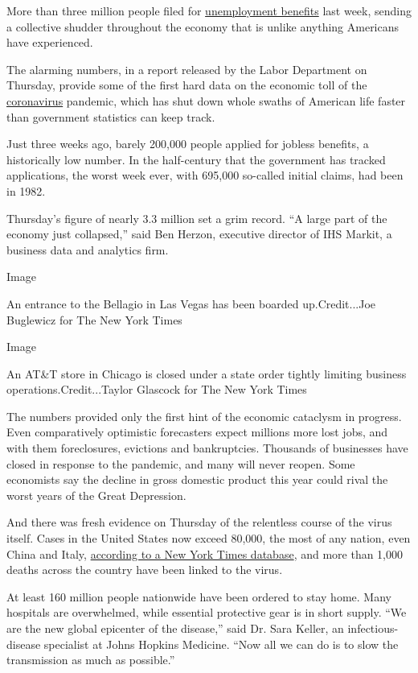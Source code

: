 More than three million people filed for
\href{https://www.nytimes.com/2020/04/03/upshot/coronavirus-jobless-rate-great-depression.html}{unemployment
benefits} last week, sending a collective shudder throughout the economy
that is unlike anything Americans have experienced.

The alarming numbers, in a report released by the Labor Department on
Thursday, provide some of the first hard data on the economic toll of
the
\href{https://www.nytimes.com/2020/04/03/upshot/coronavirus-jobless-rate-great-depression.html}{coronavirus}
pandemic, which has shut down whole swaths of American life faster than
government statistics can keep track.

Just three weeks ago, barely 200,000 people applied for jobless
benefits, a historically low number. In the half-century that the
government has tracked applications, the worst week ever, with 695,000
so-called initial claims, had been in 1982.

Thursday's figure of nearly 3.3 million set a grim record. ``A large
part of the economy just collapsed,'' said Ben Herzon, executive
director of IHS Markit, a business data and analytics firm.

Image

An entrance to the Bellagio in Las Vegas has been boarded
up.Credit...Joe Buglewicz for The New York Times

Image

An AT\&T store in Chicago is closed under a state order tightly limiting
business operations.Credit...Taylor Glascock for The New York Times

The numbers provided only the first hint of the economic cataclysm in
progress. Even comparatively optimistic forecasters expect millions more
lost jobs, and with them foreclosures, evictions and bankruptcies.
Thousands of businesses have closed in response to the pandemic, and
many will never reopen. Some economists say the decline in gross
domestic product this year could rival the worst years of the Great
Depression.

And there was fresh evidence on Thursday of the relentless course of the
virus itself. Cases in the United States now exceed 80,000, the most of
any nation, even China and Italy,
\href{https://www.nytimes.com/interactive/2020/us/coronavirus-us-cases.html}{according
to a New York Times database}, and more than 1,000 deaths across the
country have been linked to the virus.

At least 160 million people nationwide have been ordered to stay home.
Many hospitals are overwhelmed, while essential protective gear is in
short supply. ``We are the new global epicenter of the disease,'' said
Dr. Sara Keller, an infectious-disease specialist at Johns Hopkins
Medicine. ``Now all we can do is to slow the transmission as much as
possible.''

